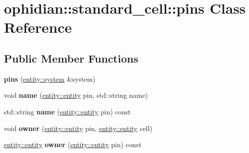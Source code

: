\hypertarget{classophidian_1_1standard__cell_1_1pins}{\section{ophidian\-:\-:standard\-\_\-cell\-:\-:pins Class Reference}
\label{classophidian_1_1standard__cell_1_1pins}
}
\subsection*{Public Member Functions}
\begin{DoxyCompactItemize}
\item 
\hypertarget{classophidian_1_1standard__cell_1_1pins_a8c40810f70dc6fae91bcf6aa65ccb5d7}{{\bfseries pins} (\hyperlink{classophidian_1_1entity_1_1system}{entity\-::system} \&system)}\label{classophidian_1_1standard__cell_1_1pins_a8c40810f70dc6fae91bcf6aa65ccb5d7}

\item 
\hypertarget{classophidian_1_1standard__cell_1_1pins_ab11d86ab457745de147cdd1843bec4ce}{void {\bfseries name} (\hyperlink{classophidian_1_1entity_1_1entity}{entity\-::entity} pin, std\-::string name)}\label{classophidian_1_1standard__cell_1_1pins_ab11d86ab457745de147cdd1843bec4ce}

\item 
\hypertarget{classophidian_1_1standard__cell_1_1pins_a57dbabc40822e9148c75ba304591ee52}{std\-::string {\bfseries name} (\hyperlink{classophidian_1_1entity_1_1entity}{entity\-::entity} pin) const }\label{classophidian_1_1standard__cell_1_1pins_a57dbabc40822e9148c75ba304591ee52}

\item 
\hypertarget{classophidian_1_1standard__cell_1_1pins_a6f41b6fb180aadbe155a463741a47390}{void {\bfseries owner} (\hyperlink{classophidian_1_1entity_1_1entity}{entity\-::entity} pin, \hyperlink{classophidian_1_1entity_1_1entity}{entity\-::entity} cell)}\label{classophidian_1_1standard__cell_1_1pins_a6f41b6fb180aadbe155a463741a47390}

\item 
\hypertarget{classophidian_1_1standard__cell_1_1pins_a3f4186d8f7bf2881df5fd7e851c7c3ad}{\hyperlink{classophidian_1_1entity_1_1entity}{entity\-::entity} {\bfseries owner} (\hyperlink{classophidian_1_1entity_1_1entity}{entity\-::entity} pin) const }\label{classophidian_1_1standard__cell_1_1pins_a3f4186d8f7bf2881df5fd7e851c7c3ad}


\end{DoxyCompactItemize}
